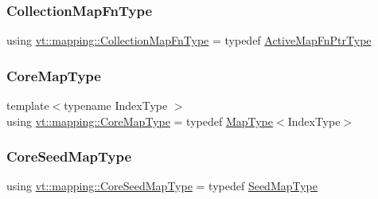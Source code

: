 \subsubsection{\texorpdfstring{Collection\+Map\+Fn\+Type}{CollectionMapFnType}}
{\footnotesize\ttfamily using \hyperlink{namespacevt_1_1mapping_a2910ab582d95478603cdca7480af65b2}{vt\+::mapping\+::\+Collection\+Map\+Fn\+Type} = typedef \hyperlink{namespacevt_1_1mapping_a748d5efb71ca5878288d5809f57d7254}{Active\+Map\+Fn\+Ptr\+Type}}

\mbox{\label{namespacevt_1_1mapping_abff207bec72f006a2e66ff14fc51255a}} 
\subsubsection{\texorpdfstring{Core\+Map\+Type}{CoreMapType}}
{\footnotesize\ttfamily template$<$typename Index\+Type $>$ \\
using \hyperlink{namespacevt_1_1mapping_abff207bec72f006a2e66ff14fc51255a}{vt\+::mapping\+::\+Core\+Map\+Type} = typedef \hyperlink{namespacevt_1_1mapping_a443f8bb8920af5ae1d3391f61fe492a6}{Map\+Type}$<$Index\+Type$>$}

\mbox{\label{namespacevt_1_1mapping_a963a37316992c8805e9a381a07380de0}} 
\subsubsection{\texorpdfstring{Core\+Seed\+Map\+Type}{CoreSeedMapType}}
{\footnotesize\ttfamily using \hyperlink{namespacevt_1_1mapping_a963a37316992c8805e9a381a07380de0}{vt\+::mapping\+::\+Core\+Seed\+Map\+Type} = typedef \hyperlink{namespacevt_1_1mapping_a1c1409d9af8d1ac402af022a65be4a4d}{Seed\+Map\+Type}}

\mbox{\label{namespacevt_1_1mapping_aa1117076bb1d73ecb84905dc391c0528}} 
